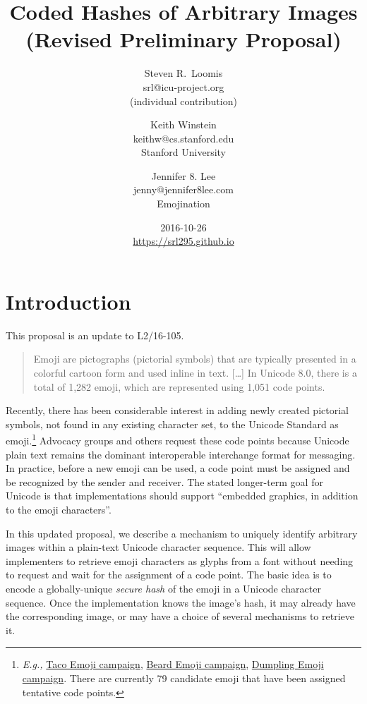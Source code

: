 \documentclass[12pt]{article}
\title{Coded Hashes of Arbitrary Images\\\normalsize \sf (Revised Preliminary Proposal)}
\author{
Steven R.~Loomis\\
\small srl@icu-project.org\\
\small (individual contribution)\\
\and
Keith Winstein\\
\small keithw@cs.stanford.edu\\
\small Stanford University\\
\and
Jennifer 8. Lee\\
\small jenny@jennifer8lee.com\\
\small Emojination\\
}
\date{2016-10-26\\\small\url{https://srl295.github.io}}
\begin{document}
\maketitle

\section{Introduction}

This proposal is an update to L2/16-105\autocite{L216105}.

\begin{quote}
Emoji are pictographs (pictorial symbols) that are typically presented
in a colorful cartoon form and used inline in text. [\ldots] In
Unicode 8.0, there is a total of 1,282 emoji, which are represented
using 1,051 code points.\autocite{UTR51}
\end{quote}

Recently, there has been considerable interest in adding newly created
pictorial symbols, not found in any existing character set, to the
Unicode Standard as emoji.\footnote{\textit{E.g.,}
  \href{https://www.change.org/p/unicode-consortium-the-taco-emoji-needs-to-happen-aeb4ebc7-a323-441d-90b9-20b90c83a8c6}{Taco
    Emoji campaign}, \href{http://www.beardemoji.com/}{Beard Emoji
    campaign}, \href{http://www.dumplingemoji.org}{Dumpling Emoji
    campaign}. There are currently 79 candidate emoji that have been
  assigned tentative code points.} Advocacy groups and others request
these code points because Unicode plain text remains the dominant
interoperable interchange format for messaging. In practice, before a
new emoji can be used, a code point must be assigned and be recognized
by the sender and receiver. The stated longer-term goal for Unicode is
that implementations should support ``embedded graphics, in addition
to the emoji characters''\autocite[Section 8, ``Longer Term
  Solutions'']{UTR51}.
  
In this updated proposal, we describe a mechanism to uniquely identify
arbitrary images within a plain-text Unicode character sequence. This
will allow implementers to retrieve emoji characters as glyphs from 
a font without needing to
request and wait for the assignment of a code point. The basic idea is
to encode a globally-unique \emph{secure hash} of the emoji in a
Unicode character sequence. Once the implementation knows the image's hash,
it may already have the corresponding image, or may have a choice of
several mechanisms to retrieve it.
\end{document}
